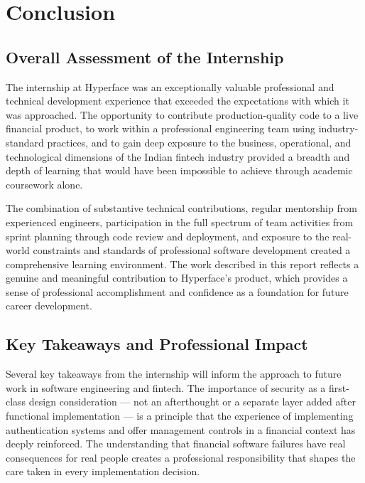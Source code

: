 \section{Conclusion}

\subsection{Overall Assessment of the Internship}

The internship at Hyperface was an exceptionally valuable professional and technical development experience that exceeded the expectations with which it was approached. The opportunity to contribute production-quality code to a live financial product, to work within a professional engineering team using industry-standard practices, and to gain deep exposure to the business, operational, and technological dimensions of the Indian fintech industry provided a breadth and depth of learning that would have been impossible to achieve through academic coursework alone.

The combination of substantive technical contributions, regular mentorship from experienced engineers, participation in the full spectrum of team activities from sprint planning through code review and deployment, and exposure to the real-world constraints and standards of professional software development created a comprehensive learning environment. The work described in this report reflects a genuine and meaningful contribution to Hyperface's product, which provides a sense of professional accomplishment and confidence as a foundation for future career development.

\subsection{Key Takeaways and Professional Impact}

Several key takeaways from the internship will inform the approach to future work in software engineering and fintech. The importance of security as a first-class design consideration — not an afterthought or a separate layer added after functional implementation — is a principle that the experience of implementing authentication systems and offer management controls in a financial context has deeply reinforced. The understanding that financial software failures have real consequences for real people creates a professional responsibility that shapes the care taken in every implementation decision.

